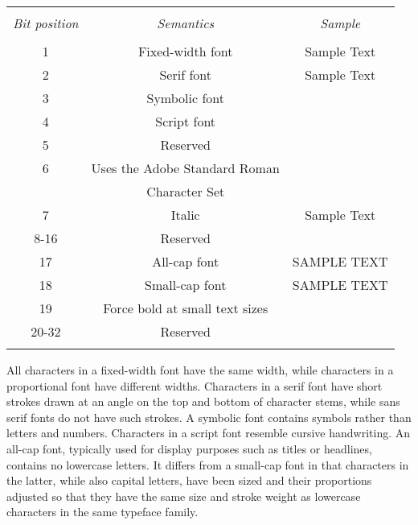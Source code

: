 \begin{itemize}
  \begin{center}
    \begin{tabular}{ccc}
      \hline \\
      \emph{Bit position} & \emph{Semantics} & \emph{Sample}  \\
      \hline \\
      1     & Fixed-width font               & Sample Text \\
      2     & Serif font                     & Sample Text \\
      3     & Symbolic font                  &             \\
      4     & Script font                    &             \\
      5     & Reserved                       &             \\
      6     & Uses the Adobe Standard Roman  &             \\
            & Character Set                  &             \\
      7     & Italic                         & Sample Text \\
      8-16  & Reserved                       &             \\
      17    & All-cap font                   & SAMPLE TEXT \\
      18    & Small-cap font                 & SAMPLE TEXT \\
      19    & Force bold at small text sizes &             \\
      20-32 & Reserved                       &             \\
      \hline \\
    \end{tabular}
  \end{center}
  
  All characters in a fixed-width font have the same width, while
  characters in a proportional font have different widths. Characters in a
  serif font have short strokes drawn 
  at an angle on the top and bottom of character stems, while sans serif fonts do not 
  have such strokes. A symbolic font contains symbols rather than letters and numbers. 
  Characters in a script font resemble cursive handwriting. An all-cap font, typically used 
  for display purposes such as titles or headlines, contains no lowercase letters. It differs 
  from a small-cap font in that characters in the latter, while also capital letters, have been 
  sized and their proportions adjusted so that they have the same size and stroke weight 
  as lowercase characters in the same typeface family. 
  

\end{itemize}
